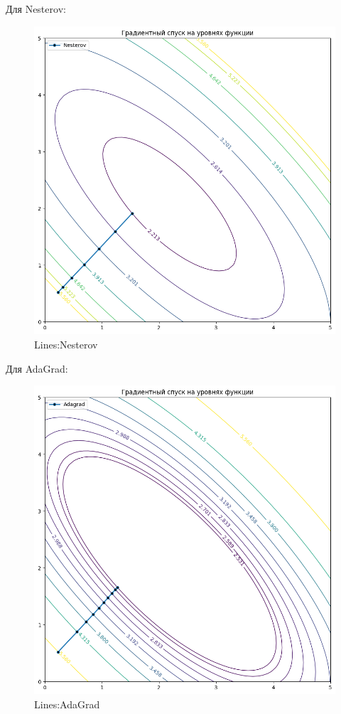 \documentclass[12pt, a4paper, oneside, final]{article}
\begin{document}
	Для Nesterov:
	\begin{figure}[H]
		\centering
		\includegraphics[scale = 0.6]{Image/T5_LINES_NESTEROV.png}
		\caption*{Lines:Nesterov}
	\end{figure}\newpage
	Для AdaGrad:
	\begin{figure}[H]
		\centering
		\includegraphics[scale = 0.6]{Image/T5_LINES_ADAGRAD.png}
		\caption*{Lines:AdaGrad}
	\end{figure}\newpage
\end{document}
